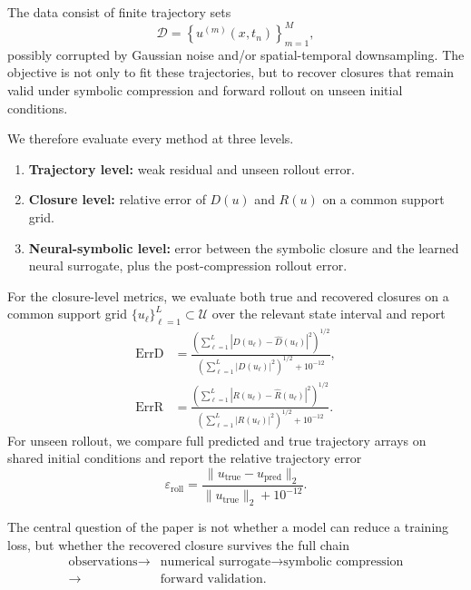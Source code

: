 \documentclass[preprint,12pt]{elsarticle}
\begin{document}
The data consist of finite trajectory sets
\begin{equation}
\mathcal{D} = \left\{ u^{(m)}(x,t_n) \right\}_{m=1}^{M},
\end{equation}
possibly corrupted by Gaussian noise and/or spatial-temporal downsampling. The objective is not only to fit these trajectories, but to recover closures that remain valid under symbolic compression and forward rollout on unseen initial conditions.

We therefore evaluate every method at three levels.
\begin{enumerate}[leftmargin=1.5em]
\item \textbf{Trajectory level:} weak residual and unseen rollout error.
\item \textbf{Closure level:} relative error of $D(u)$ and $R(u)$ on a common support grid.
\item \textbf{Neural-symbolic level:} error between the symbolic closure and the learned neural surrogate, plus the post-compression rollout error.
\end{enumerate}

For the closure-level metrics, we evaluate both true and recovered closures on a common support grid $\{u_\ell\}_{\ell=1}^L \subset \mathcal{U}$ over the relevant state interval and report
\begin{align}
\mathrm{ErrD}
&=
\frac{\left(\sum_{\ell=1}^{L} |D(u_\ell)-\widehat{D}(u_\ell)|^2 \right)^{1/2}}
{\left(\sum_{\ell=1}^{L} |D(u_\ell)|^2 \right)^{1/2} + 10^{-12}}, \\
\mathrm{ErrR}
&=
\frac{\left(\sum_{\ell=1}^{L} |R(u_\ell)-\widehat{R}(u_\ell)|^2 \right)^{1/2}}
{\left(\sum_{\ell=1}^{L} |R(u_\ell)|^2 \right)^{1/2} + 10^{-12}}.
\end{align}
For unseen rollout, we compare full predicted and true trajectory arrays on shared initial conditions and report the relative trajectory error
\begin{equation}
\varepsilon_{\mathrm{roll}}
=
\frac{\|u_{\mathrm{true}}-u_{\mathrm{pred}}\|_{2}}
{\|u_{\mathrm{true}}\|_{2}+10^{-12}}.
\end{equation}

The central question of the paper is not whether a model can reduce a training loss, but whether the recovered closure survives the full chain
\begin{equation}
\begin{aligned}
\text{observations}
\rightarrow {} & \text{numerical surrogate}
\rightarrow \text{symbolic compression} \\
\rightarrow {} & \text{forward validation}.
\end{aligned}
\end{equation}
\end{document}
